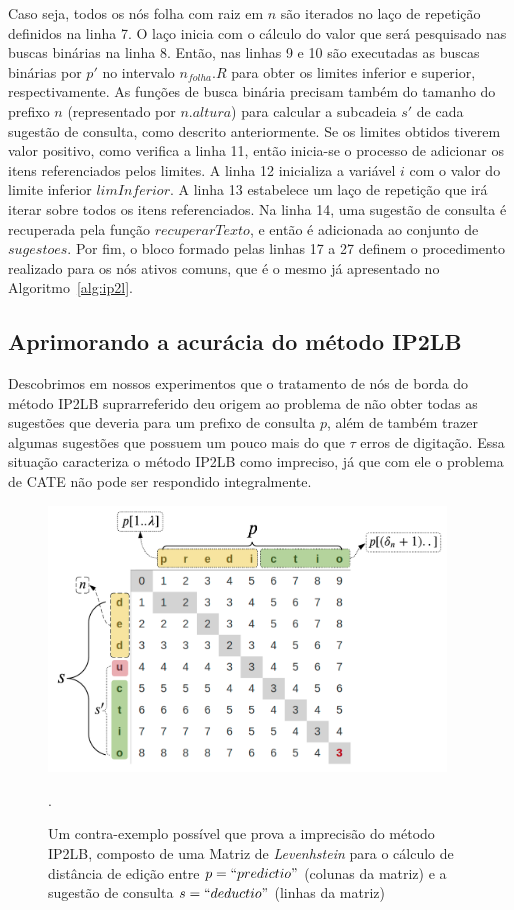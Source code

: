 Caso seja, todos os nós folha com raiz em $n$ são iterados no laço de repetição definidos na linha 7. O laço inicia com o cálculo do valor que será pesquisado nas buscas binárias na linha 8. Então, nas linhas 9 e 10 são executadas as buscas binárias por $p'$ no intervalo $n_{folha}.R$ para obter os limites inferior e superior, respectivamente. As funções de busca binária precisam também do tamanho do prefixo $n$ (representado por $n.altura$) para calcular a subcadeia $s'$ de cada sugestão de consulta, como descrito anteriormente. Se os limites obtidos tiverem valor positivo, como verifica a linha 11, então inicia-se o processo de adicionar os itens referenciados pelos limites. A linha 12 inicializa a variável $i$ com o valor do limite inferior $limInferior$. A linha 13 estabelece um laço de repetição que irá iterar sobre todos os itens referenciados. Na linha 14, uma sugestão de consulta é recuperada pela função $recuperarTexto$, e então é adicionada ao conjunto de $sugestoes$. Por fim, o bloco formado pelas linhas 17 a 27 definem o procedimento realizado para os nós ativos comuns, que é o mesmo já apresentado no Algoritmo~\ref{alg:ip2l}.

\subsection{Aprimorando a acurácia do método IP2LB}
\label{sec:IP2LRB}

Descobrimos em nossos experimentos que o tratamento de nós de borda do método IP2LB suprarreferido deu origem ao problema de não obter todas as sugestões que deveria para um prefixo de consulta $p$, além de também trazer algumas sugestões que possuem um pouco mais do que $\tau$ erros de digitação. Essa situação caracteriza o método IP2LB como impreciso, já que com ele o problema de CATE não pode ser respondido integralmente.

 \begin{figure} [ht]
    \centering
    \includegraphics[width=0.94\textwidth]{figures/binary_search_counterproof.png}
    \caption{Um contra-exemplo possível que prova a imprecisão do método IP2LB, composto de uma Matriz de \textit{Levenhstein} para o cálculo de distância de edição entre $p=``predictio"$ (colunas da matriz) e a sugestão de consulta $s=``deductio"$ (linhas da matriz)}.
    \label{fig:binary_search_counterproof}
\end{figure}

